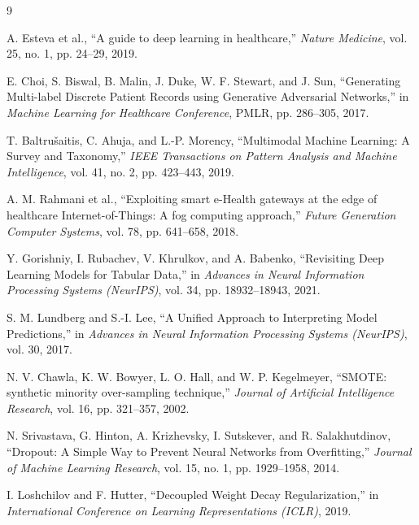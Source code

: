 \documentclass[conference]{IEEEtran}
\begin{document}
\begin{thebibliography}{9}

A. Esteva et al., ``A guide to deep learning in healthcare,'' \textit{Nature Medicine}, vol. 25, no. 1, pp. 24--29, 2019.

E. Choi, S. Biswal, B. Malin, J. Duke, W. F. Stewart, and J. Sun, ``Generating Multi-label Discrete Patient Records using Generative Adversarial Networks,'' in \textit{Machine Learning for Healthcare Conference}, PMLR, pp. 286--305, 2017.

T. Baltrušaitis, C. Ahuja, and L.-P. Morency, ``Multimodal Machine Learning: A Survey and Taxonomy,'' \textit{IEEE Transactions on Pattern Analysis and Machine Intelligence}, vol. 41, no. 2, pp. 423--443, 2019.

A. M. Rahmani et al., ``Exploiting smart e-Health gateways at the edge of healthcare Internet-of-Things: A fog computing approach,'' \textit{Future Generation Computer Systems}, vol. 78, pp. 641--658, 2018.

Y. Gorishniy, I. Rubachev, V. Khrulkov, and A. Babenko, ``Revisiting Deep Learning Models for Tabular Data,'' in \textit{Advances in Neural Information Processing Systems (NeurIPS)}, vol. 34, pp. 18932--18943, 2021.

S. M. Lundberg and S.-I. Lee, ``A Unified Approach to Interpreting Model Predictions,'' in \textit{Advances in Neural Information Processing Systems (NeurIPS)}, vol. 30, 2017.

N. V. Chawla, K. W. Bowyer, L. O. Hall, and W. P. Kegelmeyer, ``SMOTE: synthetic minority over-sampling technique,'' \textit{Journal of Artificial Intelligence Research}, vol. 16, pp. 321--357, 2002.

N. Srivastava, G. Hinton, A. Krizhevsky, I. Sutskever, and R. Salakhutdinov, ``Dropout: A Simple Way to Prevent Neural Networks from Overfitting,'' \textit{Journal of Machine Learning Research}, vol. 15, no. 1, pp. 1929--1958, 2014.

I. Loshchilov and F. Hutter, ``Decoupled Weight Decay Regularization,'' in \textit{International Conference on Learning Representations (ICLR)}, 2019.

\end{thebibliography}
\end{document}
